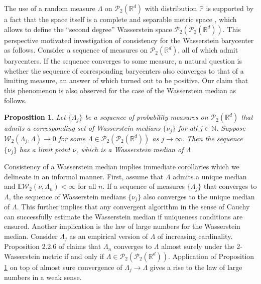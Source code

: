 \documentclass[11pt]{article}
\newcommand{\calP}{\mathcal{P}}
\newcommand{\calW}{\mathcal{W}}
\newcommand{\bbP}{\mathbb{P}}
\newcommand{\bbR}{\mathbb{R}}
\newcommand{\bbN}{\mathbb{N}}
\newtheorem{proposition}[theorem]{Proposition}
\begin{document}
The use of a random measure $\Lambda$ on $\calP_2 (\bbR^d)$ with distribution $\bbP$ is supported by a fact that the space itself is a complete and separable metric space  \citep{villani_2003_TopicsOptimalTransportation}, which allows to define the ``second degree'' Wasserstein space $\calP_2(\calP_2 (\bbR^d))$. This perspective motivated investigation of consistency for the Wasserstein barycenter \citep{legouic_2017_ExistenceConsistencyWasserstein} as follows. Consider a sequence of measures on $\calP_2(\bbR^d)$, all of which admit barycenters. If the sequence converges to some measure, a natural question is whether the sequence of corresponding barycenters also converges to that of a limiting measure, an answer of which turned out to be positive. Our claim that this phenomenon is also observed for the case of the Wasserstein median as follows.

\begin{proposition}\label{theory:median_consistency}
	Let $\lbrace \Lambda_j \rbrace$ be a sequence of probability measures on $\calP_2 (\bbR^d)$ that admits a corresponding set of Wasserstein medians $\lbrace \nu_j\rbrace $ for all $j\in \bbN$. Suppose $\calW_2 (\Lambda_j, \Lambda) \rightarrow 0$ for some $\Lambda \in \calP_2 (\calP_2 (\bbR^d))$ as $j\rightarrow \infty$. Then the sequence $\lbrace \nu_j \rbrace$ has a limit point $\nu$, which is a Wasserstein median of $\Lambda$. 
\end{proposition}


Consistency of a Wasserstein median implies immediate corollaries which we delineate in an informal manner. First, assume that $\Lambda$ admits a unique median and  $\mathbb{E}\calW_2(\nu, \Lambda_n) < \infty$ for all $n$.  If a sequence of measures $\lbrace \Lambda_j  \rbrace$ that converges to $\Lambda$, the sequence of Wasserstein medians $\lbrace \nu_j \rbrace$ also converges to the unique median of $\Lambda$.  This further implies that any convergent algorithm in the sense of Cauchy can successfully estimate the  Wasserstein median if uniqueness conditions are ensured. Another implication is the law of large numbers for the Wasserstein median. Consider $\Lambda_j$ as an empirical version of $\Lambda$ of increasing cardinality. Proposition 2.2.6 of \cite{panaretos_2020_InvitationStatisticsWasserstein} claims that $\Lambda_n$ converges to $\Lambda$ almost surely under the 2-Wasserstein metric if and only if $\Lambda \in \calP_2 (\calP_2 (\bbR^d))$. Application of Proposition \ref{theory:median_consistency} on top of almost sure convergence of $\Lambda_j \rightarrow \Lambda$ gives a rise to the law of large numbers in a weak sense.  
\end{document}
